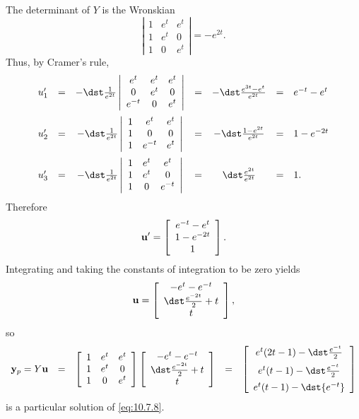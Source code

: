 \begin{examplesolution}
\[\]
The determinant of $Y$ is the Wronskian
\[
  \left|
  \begin{array}{ccc}
    1 & e^{t} & e^{t} \\
    1 & e^{t} & 0     \\
    1 & 0     & e^{t}
  \end{array}\right| =-e^{2t}.
\]
Thus, by Cramer's rule,
\[
  \begin{array}{cccccll}
    u_{1}' & = & -\dst\frac{1}{e^{2t}}\left|\begin{array}{ccc}e^{t}&e^{t}&e^{t}\\0&e^{t}&0\\e^{-t}&0&e^{t}\end{array}\right| & = & -\dst\frac{e^{3t}-e^{t}}{e^{2t}} & = & e^{-t}-e^{t} \\[6\jot]
    u_{2}' & = & -\dst\frac{1}{e^{2t}}\left|\begin{array}{ccc}1&e^{t}&e^{t}\\1&0&0\\1&e^{-t}&e^{t}\end{array}\right|         & = & -\dst\frac{1-e^{2t}}{e^{2t}}     & = & 1-e^{-2t}    \\[6\jot]
    u_{3}' & = & -\dst\frac{1}{e^{2t}}\left|\begin{array}{ccc}1&e^{t}&e^{t}\\1&e^{t}&0\\1&0&e^{-t}\end{array}\right|         & = & \dst\frac{e^{2t}}{e^{2t}}        & = & 1.
  \end{array}
\]
Therefore
\[
  {\bf u}'=\left[
  \begin{array}{c}
    e^{-t}-e^{t} \\
    1-e^{-2t}    \\
    1
  \end{array}\right].
\]
Integrating and taking the constants of integration to be zero yields
\[
  {\bf u}=\left[
  \begin{array}{c}
    -e^{t}-e^{-t}           \\
    \dst\frac{e^{-2t}}{2}+t \\
    t
  \end{array}\right],
\]
so
\[
  \begin{array}{ccccl}
    {\bf y}_{p}=Y{\bf u} & = & \left[\begin{array}{ccc}1&e^{t}&e^{t}\\1&e^{t}&0\\1&0&e^{t}\end{array}\right] \left[\begin{array}{c}-e^{t}-e^{-t}\\\dst\frac{e^{-2t}}{2}+t\\t\end{array}\right] & = & \left[\begin{array}{c}e^{t}(2t-1)-\dst\frac{e^{-t}}{2}\\[5pt]e^{t}(t-1)-\dst\frac{e^{-t}}{2}\\[5pt]e^{t}(t-1)-\dst{e^{-t}}\end{array}\right]
  \end{array}
\]
is a particular solution of \eqref{eq:10.7.8}.


\end{examplesolution}
